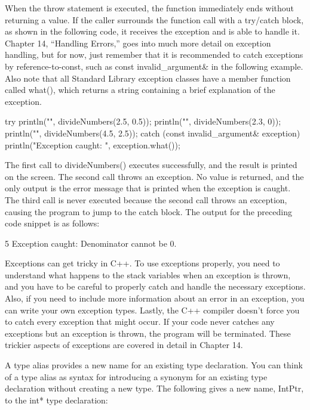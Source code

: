 When the throw statement is executed, the function immediately ends without returning a value. If the caller surrounds the function call with a try/catch block, as shown in the following code, it receives the exception and is able to handle it. Chapter 14, “Handling Errors,” goes into much more detail on exception handling, but for now, just remember that it is recommended to catch exceptions by reference-to-const, such as const invalid\_argument\& in the following example. Also note that all Standard Library exception classes have a member function called what(), which returns a string containing a brief explanation of the exception.

\begin{cpp}
try {
    println("{}", divideNumbers(2.5, 0.5));
    println("{}", divideNumbers(2.3, 0));
    println("{}", divideNumbers(4.5, 2.5));
} catch (const invalid_argument& exception) {
    println("Exception caught: {}", exception.what());
}
\end{cpp}

The first call to divideNumbers() executes successfully, and the result is printed on the screen. The second call throws an exception. No value is returned, and the only output is the error message that is printed when the exception is caught. The third call is never executed because the second call throws an exception, causing the program to jump to the catch block. The output for the preceding code snippet is as follows:

\begin{shell}
5
Exception caught: Denominator cannot be 0.
\end{shell}

Exceptions can get tricky in C++. To use exceptions properly, you need to understand what happens to the stack variables when an exception is thrown, and you have to be careful to properly catch and handle the necessary exceptions. Also, if you need to include more information about an error in an exception, you can write your own exception types. Lastly, the C++ compiler doesn’t force you to catch every exception that might occur. If your code never catches any exceptions but an exception is thrown, the program will be terminated. These trickier aspects of exceptions are covered in detail in Chapter 14.


A type alias provides a new name for an existing type declaration. You can think of a type alias as syntax for introducing a synonym for an existing type declaration without creating a new type. The following gives a new name, IntPtr, to the int* type declaration:

